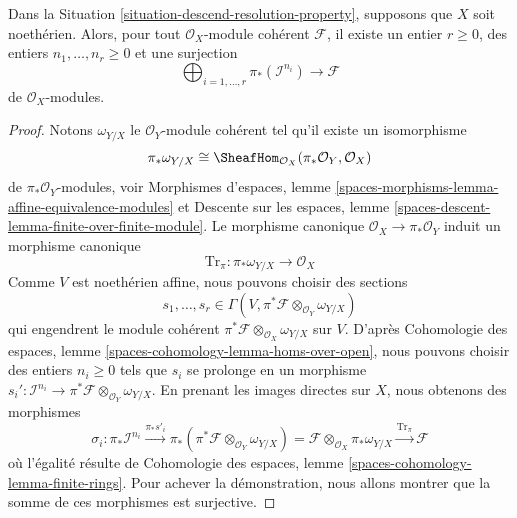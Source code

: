 \begin{lemma}
\label{lemma-surjection-in-Noetherian-case}
Dans la Situation \ref{situation-descend-resolution-property}, supposons que
$X$ soit noethérien. Alors, pour tout $\mathcal{O}_X$-module cohérent
$\mathcal{F}$, il existe un entier $r \geq 0$,
des entiers $n_1, \ldots, n_r \geq 0$ et une surjection
$$
\bigoplus\nolimits_{i = 1, \ldots, r} \pi_*(\mathcal{I}^{n_i})
\longrightarrow \mathcal{F}
$$
de $\mathcal{O}_X$-modules.
\end{lemma}

\begin{proof}
Notons $\omega_{Y/X}$ le $\mathcal{O}_Y$-module cohérent tel qu'il existe
un isomorphisme
$$
\pi_*\omega_{Y/X} \cong
\SheafHom_{\mathcal{O}_X}(\pi_*\mathcal{O}_Y, \mathcal{O}_X)
$$
de $\pi_*\mathcal{O}_Y$-modules, voir Morphismes d'espaces, lemme
\ref{spaces-morphisms-lemma-affine-equivalence-modules} et
Descente sur les espaces, lemme \ref{spaces-descent-lemma-finite-over-finite-module}.
Le morphisme canonique $\mathcal{O}_X \to \pi_*\mathcal{O}_Y$
induit un morphisme canonique
$$
\text{Tr}_\pi : \pi_*\omega_{Y/X} \longrightarrow \mathcal{O}_X
$$
Comme $V$ est noethérien affine, nous pouvons choisir des sections
$$
s_1, \ldots, s_r \in
\Gamma(V, \pi^*\mathcal{F} \otimes_{\mathcal{O}_Y} \omega_{Y/X})
$$
qui engendrent le module cohérent
$\pi^*\mathcal{F} \otimes_{\mathcal{O}_X} \omega_{Y/X}$
sur $V$. D'après
Cohomologie des espaces, lemme \ref{spaces-cohomology-lemma-homs-over-open},
nous pouvons choisir des entiers $n_i \geq 0$ tels que $s_i$
se prolonge en un morphisme
$s_i' : \mathcal{I}^{n_i} \to
\pi^*\mathcal{F} \otimes_{\mathcal{O}_Y} \omega_{Y/X}$.
En prenant les images directes sur $X$, nous obtenons des morphismes
$$
\sigma_i :
\pi_*\mathcal{I}^{n_i}
\xrightarrow{\pi_*s'_i}
\pi_*(\pi^*\mathcal{F} \otimes_{\mathcal{O}_Y} \omega_{Y/X}) =
\mathcal{F} \otimes_{\mathcal{O}_X} \pi_*\omega_{Y/X}
\xrightarrow{\text{Tr}_\pi} \mathcal{F}
$$
où l'égalité résulte de
Cohomologie des espaces, lemme \ref{spaces-cohomology-lemma-finite-rings}.
Pour achever la démonstration, nous allons montrer que la somme de ces morphismes est surjective.


\end{proof}
